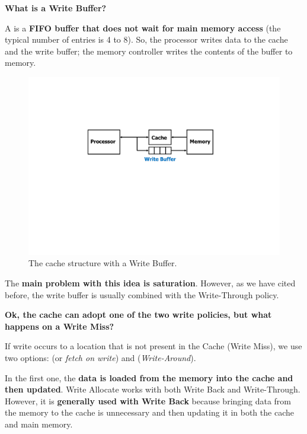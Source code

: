 \begin{flushleft}
    \textcolor{Red2}{ \textbf{What is a Write Buffer?}}
\end{flushleft}

\noindent
A  is a \textbf{FIFO buffer that does not wait for main memory access} (the typical number of entries is 4 to 8). So, the processor writes data to the cache and the write buffer; the memory controller writes the contents of the buffer to memory.

\begin{figure}[!htp]
    \centering
    \includegraphics[width=.8\textwidth]{img/write-buffer-1.pdf}
    \caption{The cache structure with a Write Buffer.}
\end{figure}

\noindent
The \textbf{main problem with this idea is saturation}. However, as we have cited before, the write buffer is usually combined with the Write-Through policy.

\newpage

\begin{flushleft}
    \textcolor{Red2}{ \textbf{Ok, the cache can adopt one of the two write policies, but what happens on a Write Miss?}}
\end{flushleft}

\noindent
If write occurs to a location that is not present in the Cache (Write Miss), we use two options:  (or \emph{fetch on write}) and  (\emph{Write-Around}). 

\highspace
In the first one, the \textbf{data is loaded from the memory into the cache and then updated}. Write Allocate works with both Write Back and Write-Through. However, it is \textbf{generally used with Write Back} because bringing data from the memory to the cache is unnecessary and then updating it in both the cache and main memory.

